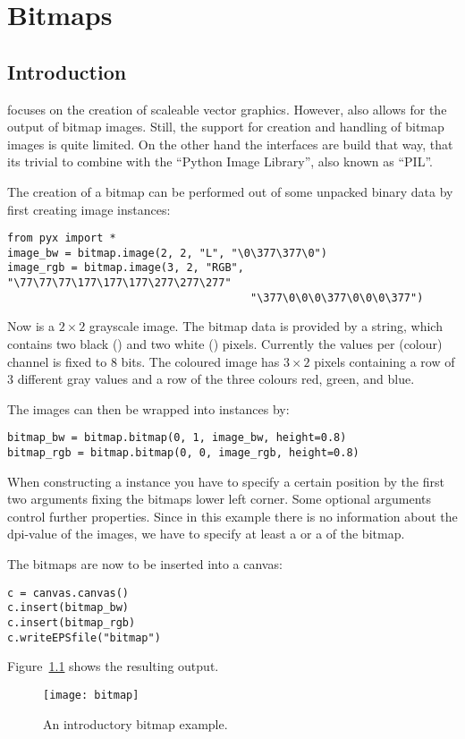 \chapter{Bitmaps}
\section{Introduction}
\PyX{} focuses on the creation of scaleable vector graphics. However,
\PyX{} also allows for the output of bitmap images. Still, the support
for creation and handling of bitmap images is quite limited. On the
other hand the interfaces are build that way, that its trivial to
combine \PyX{} with the ``Python Image Library'', also known as
``PIL''.

The creation of a bitmap can be performed out of some unpacked binary
data by first creating image instances:
\begin{verbatim}
from pyx import *
image_bw = bitmap.image(2, 2, "L", "\0\377\377\0")
image_rgb = bitmap.image(3, 2, "RGB", "\77\77\77\177\177\177\277\277\277"
                                      "\377\0\0\0\377\0\0\0\377")
\end{verbatim}
Now  is a $2\times2$ grayscale image. The bitmap data
is provided by a string, which contains two black () and two white () pixels. Currently
the values per (colour) channel is fixed to 8 bits. The coloured image
 has $3\times2$ pixels containing a row of 3 different
gray values and a row of the three colours red, green, and blue.

The images can then be wrapped into  instances by:
\begin{verbatim}
bitmap_bw = bitmap.bitmap(0, 1, image_bw, height=0.8)
bitmap_rgb = bitmap.bitmap(0, 0, image_rgb, height=0.8)
\end{verbatim}
When constructing a  instance you have to specify a
certain position by the first two arguments fixing the bitmaps lower
left corner. Some optional arguments control further properties. Since
in this example there is no information about the dpi-value of the
images, we have to specify at least a  or a 
of the bitmap.

The bitmaps are now to be inserted into a canvas:
\begin{verbatim}
c = canvas.canvas()
c.insert(bitmap_bw)
c.insert(bitmap_rgb)
c.writeEPSfile("bitmap")
\end{verbatim}
Figure~\ref{fig:bitmap} shows the resulting output.
\begin{figure}[ht]
\centerline{\texttt{[image: bitmap]}}
\caption{An introductory bitmap example.}
\label{fig:bitmap}
\end{figure}

